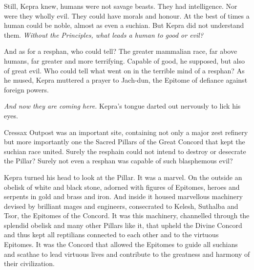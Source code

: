 \documentclass
  [a4paper,
   12pt,
   oneside
  ]%
  {article}
\begin{document}
Still, Kepra knew, humans were not savage beasts. They had intelligence. Nor were they wholly evil. They could have morals and honour. At the best of times a human could be noble, almost as even a suchian. But Kepra did not understand them. \emph{Without the Principles, what leads a human to good or evil?} 

And as for a resphan, who could tell? The greater mammalian race, far above humans, far greater and more terrifying. Capable of good, he supposed, but also of great evil. Who could tell what went on in the terrible mind of a resphan? As he mused, Kepra muttered a prayer to Jach-dun, the Epitome of defiance against foreign powers.

\emph{And now they are coming here.} Kepra’s tongue darted out nervously to lick his eyes.



Cressax Outpost was an important site, containing not only a major zest refinery but more importantly one the Sacred Pillars of the Great Concord that kept the suchian race united. Surely the resphain could not intend to destroy or desecrate the Pillar? Surely not even a resphan was capable of such blasphemous evil? 

Kepra turned his head to look at the Pillar. It was a marvel. On the outside an obelisk of white and black stone, adorned with figures of Epitomes, heroes and serpents in gold and brass and iron. And inside it housed marvellous machinery devised by brilliant mages and engineers, consecrated to Kelesh, Suthalba and Tsor, the Epitomes of the Concord. It was this machinery, channelled through the splendid obelisk and many other Pillars like it, that upheld the Divine Concord and thus kept all reptilians connected to each other and to the virtuous Epitomes. It was the Concord that allowed the Epitomes to guide all suchians and scathae to lead virtuous lives and contribute to the greatness and harmony of their civilization.
\end{document}
